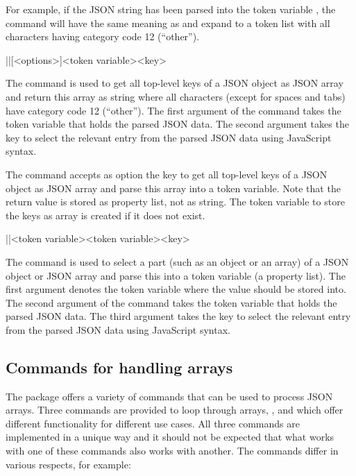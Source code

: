 \documentclass[a4paper]{article}
\begin{document}
{{For example, if the JSON string  has been parsed into the token variable \macro{\myJSONdata}, the command  will have the same meaning as  and expand to a token list with all characters having category code 12 (``other'').

\begin{macrodef}
|\JSONParseKeys|[<options>]{<token variable>}{<key>}
\end{macrodef}
The command \macro{\JSONParseKeys} is used to get all top-level keys of a JSON object as JSON array and return this array as string where all characters (except for spaces and tabs) have category code 12 (``other''). The first argument of the command takes the token variable that holds the parsed JSON data. The second argument takes the key to select the relevant entry from the parsed JSON data using JavaScript syntax.

The command \macro{\JSONParseKeys} accepts as option the key  to get all top-level keys of a JSON object as JSON array and parse this array into a token variable. Note that the return value is stored as property list, not as string. The token variable to store the keys as array is created if it does not exist.

\begin{macrodef}
|\JSONParseFilter|{<token variable>}{<token variable>}{<key>}
\end{macrodef}
The command \macro{\JSONParseFilter} is used to select a part (such as an object or an array) of a JSON object or JSON array and parse this into a token variable (a property list). The first argument denotes the token variable where the value should be stored into. The second argument of the command takes the token variable that holds the parsed JSON data. The third argument takes the key to select the relevant entry from the parsed JSON data using JavaScript syntax.

\subsection{Commands for handling arrays}

The package offers a variety of commands that can be used to process JSON arrays. Three commands are provided to loop through arrays, \macro{\JSONParseArrayUse}, \macro{\JSONParseArrayMapFunction} and \macro{\JSONParseArrayMapInline} which offer different functionality for different use cases. All three commands are implemented in a unique way and it should not be expected that what works with one of these commands also works with another. The commands differ in various respects, for example:

}}
\end{document}
